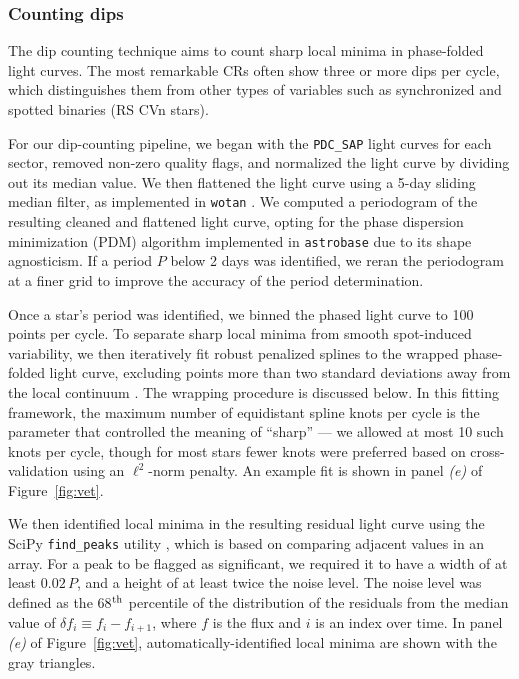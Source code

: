 \documentclass[11pt,twocolumn,tighten]{aastex63}
\begin{document}
\subsubsection{Counting dips}
\label{subsec:counting}

The dip counting technique aims to count sharp local minima in
phase-folded light curves.  The most remarkable CRs often show three
or more dips per cycle, which distinguishes them from other types of
variables such as synchronized and spotted binaries (RS CVn stars).

For our dip-counting pipeline, we began with the {\tt PDC\_SAP} light
curves for each sector, removed non-zero quality flags, and normalized
the light curve by dividing out its median value.  We then flattened
the light curve using a 5-day sliding median filter, as implemented in
\texttt{wotan} \citep{2019AJ....158..143H}.  We computed a periodogram
of the resulting cleaned and flattened light curve, opting for the
\citet{1978ApJ...224..953S} phase dispersion minimization (PDM)
algorithm implemented in \texttt{astrobase}
\citep{2021zndo...1011188B} due to its shape agnosticism.  If a period
$P$ below 2 days was identified, we reran the periodogram at a finer
grid to improve the accuracy of the period determination.

Once a star's period was identified, we binned the phased light curve
to 100 points per cycle.  To separate sharp local minima from smooth
spot-induced variability, we then iteratively fit robust penalized
splines to the wrapped phase-folded light curve, excluding points more
than two standard deviations away from the local continuum
\citep{2019AJ....158..143H}.  The wrapping procedure is discussed
below.  In this fitting framework, the maximum number of equidistant
spline knots per cycle is the parameter that controlled the meaning of
``sharp'' --- we allowed at most 10 such knots per cycle, though for
most stars fewer knots were preferred based on cross-validation using
an $\ell^2$-norm penalty.  An example fit is shown in panel {\it (e)}
of Figure~\ref{fig:vet}.

We then identified local minima in the resulting residual light curve
using the SciPy \texttt{find\_peaks} utility
\citep{2020NatMe..17..261V}, which is based on comparing adjacent
values in an array.  For a peak to be flagged as significant, we
required it to have a width of at least $0.02\,P$, and a height of at
least twice the noise level.  The noise level was defined
as the 68$^{\rm th}$ percentile of the distribution of the residuals
from the median value of $\delta f_i \equiv f_i - f_{i+1}$, where $f$
is the flux and $i$ is an index over time.
In panel {\it (e)} of Figure~\ref{fig:vet}, automatically-identified
local minima are shown with the gray triangles.
\end{document}
